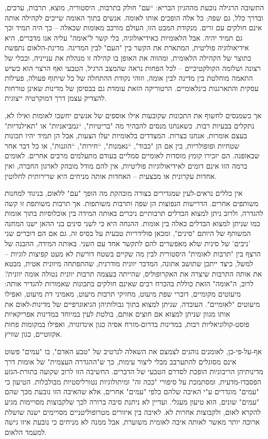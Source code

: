 התשובה הרגילה נובעת מההגיון הבריא: “עם" חולק בתרבות, היסטוריה, מוצא, תרבות, ערכים, ובדרך כלל, גם שפה; כל אלה הופכים אותו לאומה. אנשים בתוך האומה שייכים לקהילה אותה אינם חולקים עם זרים. מנקודת המבט הזו, העולם מורכב מאומות שכאלה – כך היה תמיד וכך גם תמיד יהיה. אבל הלאומיות כאידיאולוגיה, בלי קשר ל"אומה" עליה אנו מדברים, היא אידיאולוגיה פוליטית, המתארת את הקשר בין "העם" לבין המדינה. מדינת-הלאום נתפשת כתוצר של הקהילה הלאומית, ומהווה את האופן בו קהילה זו מנהלת את ענייניה, וככלי של רצונה ושלומה הקולקטיביים – לכל הפחות נראה שהמצב הרגיל, הטבעי ואף הרצוי הוא כשיש התאמה מוחלטת בין מדינה לבין אומה, וזוהי נקודת ההתחלה של כל שיתוף פעולה, פעילות עסקית והתארגנות בינלאומיים. הרטוריקה הזאת עומדת גם בבסיסן של מדינות שאינן טורחות להצדיק עצמן דרך דמוקרטיה ייצוגית.

אך כשמנסים לחשוף את התכונות שקובעות אילו אוספים של אנשים יחשבו לאומות ואילו לא, נתקלים בבעיות רבות. כשאנחנו מנסים להבהיר מה "בריטיות", “גמביאניות" או "תאילנדיות" בעצם אומרות, אנחנו בצרות. המצדדים בלאומיות יעלו הצעות, אבל הן תמיד יהיו תכונות שטחיות ופופולריות, בין אם הן "כבוד", “נאמנות", “חירות", “הוגנות", או כל דבר אחר שבאופנה. הם יזכירו קומץ מוסדות לאומיים סמליים בעודם מתעלמים מרבים אחרים. לאומים ברמה הזו אינם דומים לאידיאולוגיות פוליטיות, אין להם מודל מובהק לארגון החברה, ואין אחדות עקרונית או מבצעית – האחדות אותה מניחים היא שרירותית לחלוטין.

אין כללים נראים-לעין שמגדירים בצורה מובהקת מה הופך "עם" ללאום, בניגוד למחנות משותפים אחרים. הדרישות הנפוצות הן שפה ותרבות משותפות. אך תרבות משותפת זו קשה להגדרה, ולרוב ניתן למצוא הבדלים תרבותיים ניכרים באותה המידה בין אוכלוסיות בתוך אומות כמו שניתן למצוא הבדלים כאלה בין אומות. ההנחה היא כי לשני סינים בני ההאן ישנו המחנה המשותף של היותם "סינים", ומכאן סולידריות טבעית על בסיס זה, גם אם הם דוברים שני 'ניבים' של סינית שלא מאפשרים להם לתקשר אחד עם השני. באותה המידה, ההבנה של הרצף בין "תרבות לאומית" היסטורית לבין מה  שקיים בשטח דורשת לא מעט קפיצות לוגיות – למשל, כיצד ייתכן שתושב אתונה, המדבר יוונית מודרנית, שהתפתחה מיוונית אטית, מבטא את אותה התרבות שיצרה את האקרופוליס, שהייתה בעצמה תרבות יוונית נטולה אומה יוונית? לרוב, ה"אומה" הזאת כוללת בהכרח רבים שאינם חולקים בתכונות שאמורות להגדיר אותה: מיעוטים מקומיים, דוברי שפת מיעוט, מחזיקי תרבות מיעוט, מאמיני דת מיעוט, ואפילו מיעוטים "לאומיים". העובדה, שניתן למצוא בתוך גבולותיהן הגיאוגרפיים של מדינות-לאום את אותו מגוון שניתן למצוא אם חוצים אותם, בולטת לעין במיוחד במדינות אפריקאיות פוסט-קולוניאליות רבות, במדינות בדרום-מזרח אסיה כגון אינדונזיה, ואפילו במקומות פחות אקזוטיים, כגון שוויץ.

אף-על-פי-כן, לאומנים נוהגים לצמצם את השאלה לנרטיב של "טבע האדם", בו "עמים" פשוט אינם מסוגלים להתערבב מבלי ליצור עימות, כך ש"ההגדרה העצמית" של אומות דרך מדינותיהן הריבוניות הופכת לסדרם הטבעי של הדברים. החשיבה הזו לרוב שקועה בתורת-הגזע הפסבדו-מדעית, ומסתמכת על סיפורי "ככה זה" ומיתולוגיות נטורליסטיות מבולבלות. הטיעון כי "עמים" מוגדרים ע"י האיבה שלהם כלפי "עמים" אחרים, אלא שהאיבה הזו נובעת מכך שהם "עמים" שונים, הוא טיעון מעגלי. ועדיין לא ניתנת סיבה ברורה לכך שלקבוצות מסויימות מגיע להקרא לאום, ולקבוצות אחרות לא. לאיבה בין איזורים מטרופוליטניים מסויימים ישנה שושלת ארוכה יותר מאשר לאותה איבה לאומית משוערת, אבל ממנה לא מניחים כי נובעת איזו גישה למעמד הלאום.

